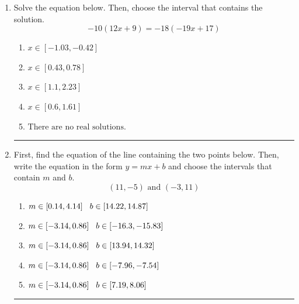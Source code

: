 \documentclass[14pt]{extbook}
\newcommand{\litem}[1]{\item#1\hspace*{-1cm}\rule{\textwidth}{0.4pt}}
\begin{document}
\begin{enumerate}
{\begin{enumerate}[label=\Alph*.]
\end{enumerate} }
\litem{
Solve the equation below. Then, choose the interval that contains the solution.\[ -10(12x + 9) = -18(-19x + 17) \]\begin{enumerate}[label=\Alph*.]
\item \( x \in [-1.03, -0.42] \)
\item \( x \in [0.43, 0.78] \)
\item \( x \in [1.1, 2.23] \)
\item \( x \in [0.6, 1.61] \)
\item \( \text{There are no real solutions.} \)

\end{enumerate} }
\litem{
First, find the equation of the line containing the two points below. Then, write the equation in the form $ y=mx+b $ and choose the intervals that contain $m$ and $b$.\[ (11, -5) \text{ and } (-3, 11) \]\begin{enumerate}[label=\Alph*.]
\item \( m \in [0.14, 4.14] \hspace*{3mm} b \in [14.22, 14.87] \)
\item \( m \in [-3.14, 0.86] \hspace*{3mm} b \in [-16.3, -15.83] \)
\item \( m \in [-3.14, 0.86] \hspace*{3mm} b \in [13.94, 14.32] \)
\item \( m \in [-3.14, 0.86] \hspace*{3mm} b \in [-7.96, -7.54] \)
\item \( m \in [-3.14, 0.86] \hspace*{3mm} b \in [7.19, 8.06] \)


\end{enumerate}}
\end{enumerate}
\end{document}
